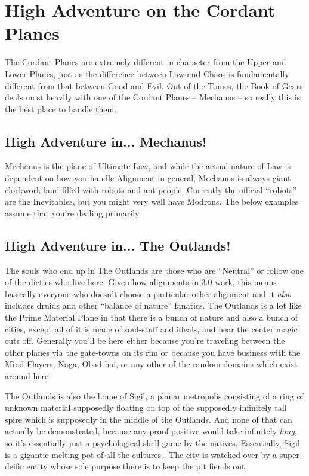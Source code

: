 \chapter{High Adventure on the Cordant Planes}

The Cordant Planes are extremely different in character from the Upper and Lower Planes, just as the difference between Law and Chaos is fundamentally different from that between Good and Evil. Out of the Tomes, the Book of Gears deals most heavily with one of the Cordant Planes -- Mechanus -- so really this is the best place to handle them.

\section{High Adventure in... Mechanus!}

Mechanus is the plane of Ultimate Law, and while the actual nature of Law is dependent on how you handle Alignment in general, Mechanus is always giant clockwork land filled with robots and ant-people. Currently the official ``robots'' are the Inevitables, but you might very well have Modrons. The below examples assume that you're dealing primarily 

%

\section{High Adventure in... The Outlands!}

The souls who end up in The Outlands are those who are ``Neutral'' or follow one of the dieties who live here. Given how alignments in 3.0 work, this means basically everyone who doesn't choose a particular other alignment and it \emph{also} includes druids and other ``balance of nature'' fanatics. The Outlands is a lot like the Prime Material Plane in that there is a bunch of nature and also a bunch of cities, except all of it is made of soul-stuff and ideals, and near the center magic cuts off. Generally you'll be here either because you're traveling between the other planes via the gate-towns on its rim or because you have business with the Mind Flayers, Naga, Obad-hai, or any other of the random domains which exist around here

The Outlands is also the home of Sigil, a planar metropolis consisting of a ring of unknown material supposedly floating on top of the supposedly infinitely tall spire which is supposedly in the middle of the Outlands. And none of that can actually be demonstrated, because any proof positive would take infinitely \emph{long}, so it's essentially just a psychological shell game by the natives. Essentially, Sigil is a gigantic melting-pot of all the cultures . The city is watched over by a super-deific entity whose sole purpose there is to keep the pit fiends out.



